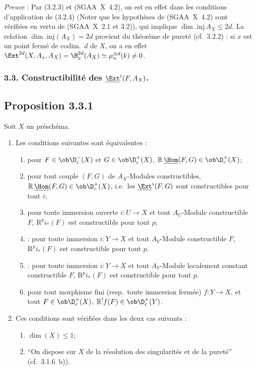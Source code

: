 \emph{Preuve} : Par (3.2.3) et (SGAA~X~4.2), on est en effet dans les conditions d'application de (3.2.4) (Noter que les hypothèses de (SGAA~X~4.2) sont vérifiées en vertu de (SGAA~X~2.1 et 3.2)), qui implique $\dim.\mathrm{inj}\, A_X \leqslant 2d$. La relation $\dim.\mathrm{inj}(A_X) = 2d$ provient du théorème de pureté (cf.~3.2.2) : si $x$ est un point fermé de codim.~$d$ de $X$, on a en effet $\Ext^{2d}(X, A_x, A_X) = \H^{2d}_x(A_X) \simeq \mu_n^{\otimes d}(k) \neq 0$.

\subsubsection*{3.3. Constructibilité des \texorpdfstring{$\underline{\Ext}^i(F, A_X)$}{Ext i(F, A\_X)}.}

\subsection*{Proposition 3.3.1}
Soit $X$ un préschéma.
\begin{enumerate}
\item[a)] Les conditions suivantes sont équivalentes :
\begin{enumerate}
\item[(i)] pour $F \in \ob \D_c^{-}(X)$ et $G \in \ob \D_c^{+}(X)$, $\mathbb{R}\,\underline{\Hom}(F,G) \in \ob \D_c^{+}(X)$;
\item[(i~bis)] pour tout couple $(F,G)$ de $A_X$-Modules constructibles, $\mathbb{R}\,\underline{\Hom}(F,G) \in \ob \D_c^{+}(X)$, i.e.~les $\underline{\Ext}^i(F,G)$ sont constructibles pour tout $i$;
\item[(ii)] pour
toute immersion ouverte $i : U \to X$ et tout $A_U$-Module constructible $F$, $\mathrm{R}^p i_{*}(F)$ est constructible pour tout $p$;
\item[(ii~bis)] : pour toute immersion $i : Y \to X$ et tout $A_Y$-Module constructible $F$, $\mathrm{R}^p i_{*}(F)$ est constructible pour tout $p$.
\item[(ii~ter)] : pour toute immersion $i : Y \to X$ et tout $A_Y$-Module localement constant constructible $F$, $\mathrm{R}^p i_{*}(F)$ est constructible pour tout $p$.
\item[(iii)] pour tout morphisme fini (resp.~toute immersion fermée) $f : Y \to X$, et tout $F \in \ob \D_c^{+}(X)$, $\mathbb{R}^{!}f(F) \in \ob \D_c^{+}(Y)$.
\end{enumerate}
\item[b)] Ces conditions sont vérifiées dans les deux cas suivants :
\begin{enumerate}
\item[(i)] $\dim(X) \leqslant 1$;
\item[(ii)] ``On dispose sur $X$ de la résolution des singularités et de la pureté'' (cf.~3.1.6~b)).
\end{enumerate}
\end{enumerate}

